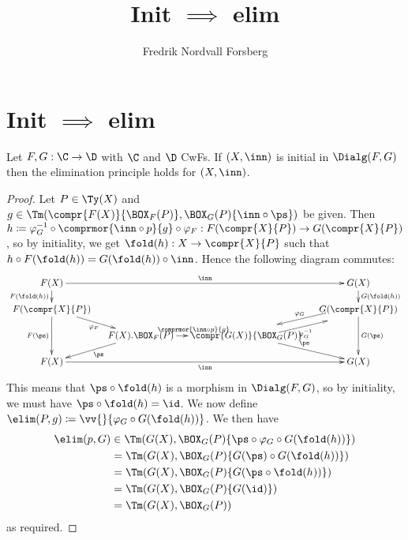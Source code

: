 \documentclass{article}
\title{Init $\implies$ elim}
\author{Fredrik Nordvall Forsberg}
\begin{document}
\maketitle

\section{Init $\implies$ elim}

\begin{theorem}
  Let $F, G : \C \to \D$ with $\C$ and $\D$ CwFs. If $(X, \inn)$ is
  initial in $\Dialg(F, G)$ then the elimination principle holds for
  $(X, \inn)$.
\end{theorem}
\begin{proof}
  Let $P \in \Ty(X)$ and $g \in \Tm(\compr{F(X)}{\BOX_F(P)},
  \BOX_G(P)\{\inn \circ \ps\})$ be given. Then $h \coloneqq
  \varphi_G^{-1} \circ \comprmor{\inn \circ p}{g} \circ \varphi_F
  : F(\compr{X}{P}) \to G(\compr{X}{P})$, so by initiality, we get $\fold(h) : X \to
  \compr{X}{P}$ such that $h \circ F(\fold(h)) = G(\fold(h)) \circ \inn$. Hence
  the following diagram commutes:
\[
\xymatrix@-1pc{
F(X) \ar^-{\inn}[rrr] \ar_-{F(\fold(h))}[d] & & & G(X) \ar^-{G(\fold(h))}[d] \\
F(\compr{X}{P}) \ar_{\varphi_F}[dr] \ar_-{F(\ps)}[dd] & & & G(\compr{X}{P}) \ar@<-1ex>_-{\varphi_G}[dl] \ar^-{G(\ps)}[dd]\\
 & F(X).\BOX_F(P) \ar^{\comprmor{\inn \circ p}{g}}[r] \ar^{\ps}[dl]& \compr{G(X)}{\BOX_G(P)} \ar@<-1ex>_-{\varphi_G^{-1}}[ur] \ar^{\ps}[dr] & \\
F(X) \ar_-{\inn}[rrr] & & & G(X)
}
\]
This means that $\ps \circ \fold(h)$ is a morphism in $\Dialg(F, G)$,
so by initiality, we must have $\ps \circ \fold(h) = \id$. We now
define $\elim(P, g) \coloneqq \vv{}\{\varphi_G \circ G(\fold(h))\}$.
We then have
\begin{align*}
  \elim(p, G) &\in \Tm(G(X), \BOX_G(P)\{ \ps \circ \varphi_G \circ G(\fold(h))\}) \\
              &=  \Tm(G(X), \BOX_G(P)\{ G(\ps) \circ G(\fold(h))\}) \\
              &=  \Tm(G(X), \BOX_G(P)\{ G(\ps \circ \fold(h))\}) \\
              &=  \Tm(G(X), \BOX_G(P)\{ G(\id)\}) \\
              &=  \Tm(G(X), \BOX_G(P))
\end{align*}
as required.


\end{proof}
\end{document}
